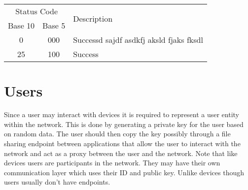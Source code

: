 \documentclass[a4paper]{report}
\begin{document}
                    \begin{center}
                        \begin{tabular}{|c|c|l|}
                            \multicolumn{2}{|c|}{Status Code} & \multirow{2}{*}{Description} \\
                            Base 10 & Base 5 & \\\hline
                            0 & 000 & Successd sajdf asdkfj aksld fjaks fksdl \\
                            25 & 100 & Success
                        \end{tabular}
                    \end{center}
                    
        \clearpage
        \section{Users}\label{section:interaction:user}
            Since a user may interact with devices it is required to represent a user entity within the network. This is done by generating a private key for the user based on random data. The user should then copy the key possibly through a file sharing endpoint between applications that allow the user to interact with the network and act as a proxy between the user and the network. Note that like devices users are participants in the network. They may have their own communication layer which uses their ID and public key. Unlike devices though users usually don't have endpoints.
	
	\clearpage
	\printglossary[type=\acronymtype]
    \printglossary
 
    \clearpage
    
    
	
\end{document}
